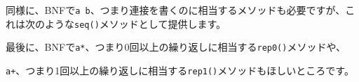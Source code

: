 同様に、BNFで\texttt{a\ b}、つまり連接を書くのに相当するメソッドも必要ですが、これは次のような\texttt{seq()}メソッドとして提供します。

\begin{Shaded}
\begin{Highlighting}[]
\NormalTok{ (} \NormalTok{\textless{}\textgreater{}(}\NormalTok{, }\NormalTok{), }\NormalTok{(}
    \NormalTok{(}\NormalTok{(}\NormalTok{), }\NormalTok{(}\NormalTok{(}\NormalTok{)}
\NormalTok{);}
\end{Highlighting}
\end{Shaded}

最後に、BNFで\texttt{a*}、つまり0回以上の繰り返しに相当する\texttt{rep0()}メソッドや、

\begin{Shaded}
\begin{Highlighting}[]
\end{Highlighting}
\end{Shaded}

\texttt{a+}、つまり1回以上の繰り返しに相当する\texttt{rep1()}メソッドもほしいところです。

\begin{Shaded}
\begin{Highlighting}[]
\NormalTok{ (} \NormalTok{\textless{}}\NormalTok{\textless{}}\NormalTok{\textgreater{}\textgreater{}(}\NormalTok{(}\NormalTok{, }\NormalTok{, }\NormalTok{), }\NormalTok{(}
  \NormalTok{(}\NormalTok{(}\NormalTok{(}\NormalTok{)}
\NormalTok{);}
\end{Highlighting}
\end{Shaded}


